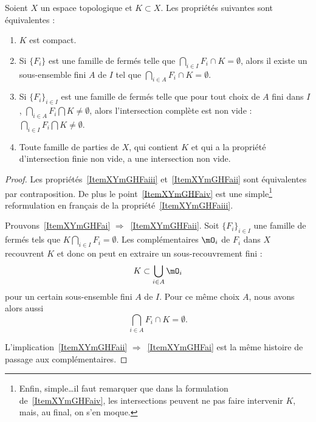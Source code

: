 \begin{proposition}\label{PropXKUMiCj}
    Soient \( X\) un espace topologique et \( K\subset X\). Les propriétés suivantes sont équivalentes :
    \begin{enumerate}
        \item\label{ItemXYmGHFai}
            \( K\) est compact.
        \item\label{ItemXYmGHFaii}
            Si \( \{ F_i \}\) est une famille de fermés telle que \( \bigcap_{i\in I}F_i \cap K =\emptyset\), alors il existe un sous-ensemble fini \( A\) de \( I\) tel que \( \bigcap_{i\in A}F_i \cap K =\emptyset\).
        \item\label{ItemXYmGHFaiii}
            Si \( \{ F_i \}_{i\in I}\) est une famille de fermés telle que pour tout choix de \( A\) fini dans \( I\), \( \bigcap_{i\in A}F_i \bigcap K \neq\emptyset\), alors l'intersection complète est non vide : \( \bigcap_{i\in I}F_i \bigcap K\neq\emptyset\).
        \item\label{ItemXYmGHFaiv}
            Toute famille de parties de \( X \), qui contient \( K \) et qui a la propriété d'intersection finie non vide, a une intersection non vide.
    \end{enumerate}
\end{proposition}

\begin{proof}
    Les propriétés~\ref{ItemXYmGHFaiii} et~\ref{ItemXYmGHFaii} sont équivalentes par contraposition. De plus le point~\ref{ItemXYmGHFaiv} est une simple\footnote{Enfin, simple\dots il faut remarquer que dans la formulation de~\ref{ItemXYmGHFaiv}, les intersections peuvent ne pas faire intervenir \( K \), mais, au final, on s'en moque.} reformulation en français de la propriété~\ref{ItemXYmGHFaiii}.

    Prouvons~\ref{ItemXYmGHFai} \( \Rightarrow\)~\ref{ItemXYmGHFaii}. Soit \( \{ F_i \}_{i\in I}\) une famille de fermés tels que \( K\bigcap_{i\in I}F_i=\emptyset\). Les complémentaires \( \mO_i\) de \( F_i\) dans \( X\) recouvrent \( K\) et donc on peut en extraire un sous-recouvrement fini :
    \begin{equation}
        K\subset\bigcup_{i\in A}\mO_i
    \end{equation}
    pour un certain sous-ensemble fini \( A\) de \( I\). Pour ce même choix \( A\), nous avons alors aussi
    \begin{equation}
        \bigcap_{i\in A}F_i \cap K =\emptyset.
    \end{equation}

    L'implication~\ref{ItemXYmGHFaii} \( \Rightarrow\)~\ref{ItemXYmGHFai} est la même histoire de passage aux complémentaires.
\end{proof}

